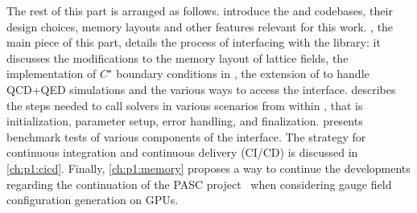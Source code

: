 The rest of this part is arranged as follows.
 introduce the \openqxd and \quda codebases, their design choices, memory layouts and other features relevant for this work.
, the main piece of this part,
details the process of interfacing \openqxd with the \quda library: it discusses the modifications to the memory layout of lattice fields, the implementation of $C^\star$ boundary conditions in \quda, the extension of \quda to handle QCD+QED simulations and the various ways to access the interface.
 describes the steps needed to call \quda solvers in various scenarios from within \openqxd, that is initialization, parameter setup, error handling, and finalization.
 presents benchmark tests of various components of the interface.
The strategy for continuous integration and continuous delivery (CI/CD) is discussed in \cref{ch:p1:cicd}.
Finally, \cref{ch:p1:memory} proposes a way to continue the developments regarding the continuation of the PASC project~\cite{online:pasc2025} when considering gauge field configuration generation on GPUs.


